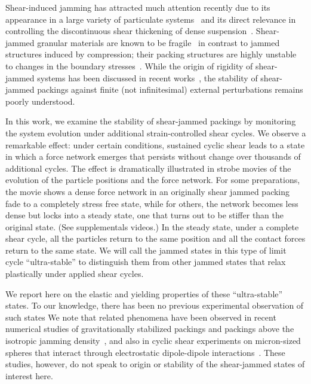 \documentclass[twocolumn,showkeys,superscriptaddress,preprintnumbers,amsmath,amssymb,showpacs,prx,longbibliography]{revtex4-2}
\newcommand{\yiqiunew}{\textcolor{testcolor}}
\begin{document}
\begin{CJK*}{UTF8}{gbsn}
Shear-induced jamming has attracted much attention recently due to its appearance in a large variety of particulate systems~\cite{Bi2011_nat,zhao2019_prl,Kumar2016_gm,urbani2017_prl,Jin2018_sa,otsuki2020_pre,Jine2021_pnas,Xiong2019_gm} and its direct relevance in controlling the discontinuous shear thickening of dense suspension~\cite{mari2014_jor,wyart2014_prl,brown2014_RPP,han2018_prf,blanco2019_pnas,morris2020_arfm}. Shear-jammed granular materials are known to be fragile~\cite{Cates1998_prl}
in contrast to jammed structures induced by compression; their packing structures are highly unstable to changes in the boundary stresses~\cite{Bi2011_nat,zhao2019_prl,seto2019_gm}. While the origin of rigidity of shear-jammed systems has been discussed in recent works~\cite{Bi2011_nat,sarkar2013_prl,sarkar2016_pre,dong2018_prl,Baity2017_jps}, the stability of shear-jammed packings against finite (not infinitesimal) external perturbations remains poorly understood. 

In this work, we examine the stability of shear-jammed packings by monitoring the system evolution under additional strain-controlled shear cycles. We observe a remarkable effect: under certain conditions, sustained cyclic shear leads to a state in which a force network emerges that persists without change over thousands of additional cycles.  The effect is dramatically illustrated in strobe movies of the evolution of the particle positions and the force network.  For some preparations, the movie shows a dense force network in an originally shear jammed packing fade to a completely stress free state, while for others, the network becomes less dense but locks into a steady state, one that 
turns out to be stiffer 
than the original state. (See supplementals videos.)  
In the steady state, under a complete shear cycle, all the particles return to the same position and all the contact forces return to the same state.  
We will call the jammed states in this type of limit cycle ``ultra-stable'' to distinguish them from other jammed states that relax plastically under applied shear cycles. 

We report here on the elastic and yielding properties of these  ``ultra-stable'' states.
To our knowledge, there has been no previous experimental observation of such states
We note that related phenomena have been observed in recent numerical studies of gravitationally stabilized packings \cite{Royer2015_pnas} and packings above the isotropic jamming density~\cite{Otsuki2021_epje}, and also in cyclic shear experiments on micron-sized spheres that interact through electrostatic dipole-dipole interactions~\cite{keim2014_prl,Galloway2022_natphy,keim2021_arxiv}. 
These studies, however, do not speak to origin or stability of the shear-jammed states of interest here. 


\end{CJK*}
\end{document}
